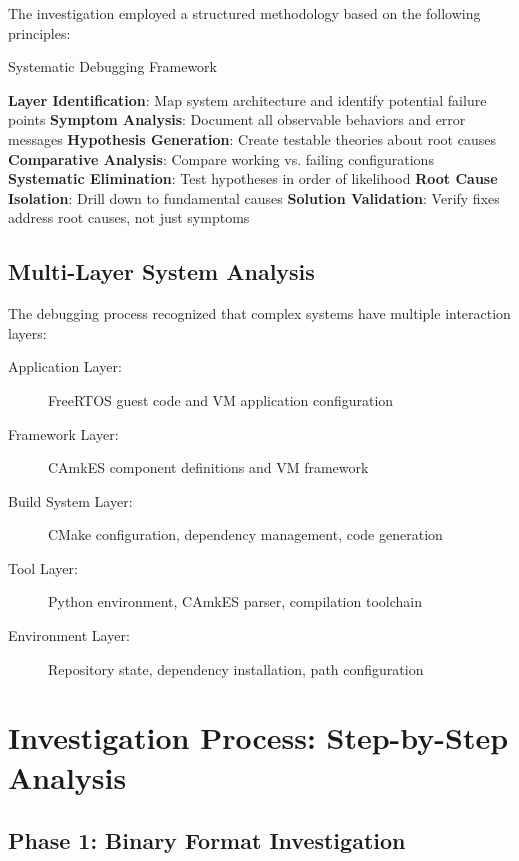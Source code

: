 \documentclass[11pt,a4paper]{article}
\begin{document}
The investigation employed a structured methodology based on the following principles:

\begin{algorithm}
\caption{Systematic Debugging Framework}
\begin{algorithmic}[1]
\State \textbf{Layer Identification}: Map system architecture and identify potential failure points
\State \textbf{Symptom Analysis}: Document all observable behaviors and error messages
\State \textbf{Hypothesis Generation}: Create testable theories about root causes
\State \textbf{Comparative Analysis}: Compare working vs. failing configurations
\State \textbf{Systematic Elimination}: Test hypotheses in order of likelihood
\State \textbf{Root Cause Isolation}: Drill down to fundamental causes
\State \textbf{Solution Validation}: Verify fixes address root causes, not just symptoms
\end{algorithmic}
\end{algorithm}

\subsection{Multi-Layer System Analysis}

The debugging process recognized that complex systems have multiple interaction layers:

\begin{description}
\item[Application Layer:] FreeRTOS guest code and VM application configuration
\item[Framework Layer:] CAmkES component definitions and VM framework
\item[Build System Layer:] CMake configuration, dependency management, code generation
\item[Tool Layer:] Python environment, CAmkES parser, compilation toolchain
\item[Environment Layer:] Repository state, dependency installation, path configuration
\end{description}

\section{Investigation Process: Step-by-Step Analysis}

\subsection{Phase 1: Binary Format Investigation}
\end{document}
